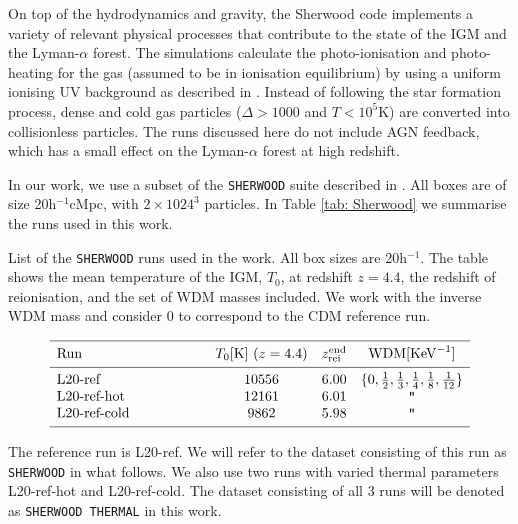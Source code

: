 On top of the hydrodynamics and gravity, the Sherwood code implements a variety of relevant physical processes that contribute to the state of the IGM and the Lyman-$\alpha$ forest. The simulations calculate the photo-ionisation and photo-heating for the gas (assumed to be in ionisation equilibrium) by using a uniform ionising UV background as described in \cite{Haardt2012}. Instead of following the star formation process, dense and cold gas particles ($\Delta>1000$ and $T<10^5$K) are converted into collisionless particles. The runs discussed here do not include AGN feedback, which has a small effect on the Lyman-$\alpha$ forest at high redshift.

In our work, we use a subset of the \texttt{SHERWOOD} suite described in \cite{sherwood_wdm}. All boxes are of size 20h$^{-1}$cMpc, with $2\times 1024^3$ particles. In Table \ref{tab: Sherwood} we summarise the runs used in this work.


\begin{table}
        \caption[]{List of the \texttt{SHERWOOD} runs used in the work.
        All box sizes are 20h$^{-1}$. The table shows the mean temperature of the IGM, $T_0$, at redshift $z=4.4$, the redshift of reionisation, and the set of WDM masses included. We work with the inverse WDM mass and consider 0 to correspond to the CDM reference run.}
           \label{tab: Sherwood}
       $$ 
           \begin{array}{p{0.3\linewidth}ccc}
              \hline
              \noalign{\smallskip}
              Run      &  T_0 {[\mathrm{K}]}\ (z=4.4) &z_\mathrm{rei}^\mathrm{end}& \mathrm{WDM} [\mathrm{KeV}^{-1}] \\ 
              \noalign{\smallskip}
              \hline
              \noalign{\smallskip}
              L20-ref & 10556 &6.00&\{0,\frac{1}{2}, \frac{1}{3}, \frac{1}{4}, \frac{1}{8}, \frac{1}{12} \}     \\
              L20-ref-hot           & 12161&6.01  &\texttt{"}\\
              L20-ref-cold     & 9862  &5.98&       \texttt{"}     \\
              \noalign{\smallskip}
              \hline
           \end{array}
       $$ 
     \end{table}
The reference run is L20-ref. We will refer to the dataset consisting of this run as \texttt{SHERWOOD} in what follows. We also use two runs with varied thermal parameters L20-ref-hot and L20-ref-cold. The dataset consisting of all 3 runs will be denoted as \texttt{SHERWOOD THERMAL} in this work.


